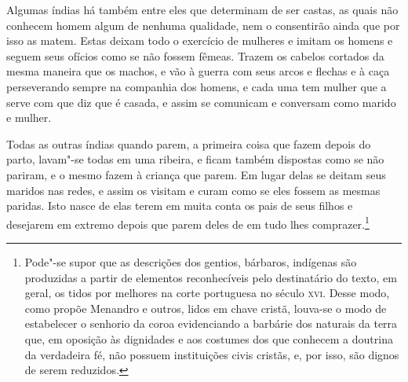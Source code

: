 Algumas índias há também entre eles que determinam de ser castas, as
quais não conhecem homem algum de nenhuma qualidade, nem o consentirão
ainda que por isso as matem. Estas deixam todo o exercício de mulheres
e imitam os homens e seguem seus ofícios como se não fossem fêmeas.
Trazem os cabelos cortados da mesma maneira que os machos, e vão à
guerra com seus arcos e flechas e à caça perseverando sempre na				%
companhia dos homens, e cada uma tem mulher que a serve com que diz que
é casada, e assim se comunicam e conversam como marido e mulher.

Todas as outras índias quando parem, a primeira coisa que fazem depois
do parto, lavam"-se todas em uma ribeira, e ficam também dispostas como		%
se não pariram, e o mesmo fazem à criança que parem. Em lugar delas se
deitam seus maridos nas redes, e assim os visitam e curam como se eles
fossem as mesmas paridas. Isto nasce de elas terem em muita conta os
pais de seus filhos e desejarem em extremo depois que parem deles de em
tudo lhes comprazer.\footnote{ Pode"-se supor que as descrições dos gentios,
bárbaros, indígenas são produzidas a partir de elementos reconhecíveis
pelo destinatário do texto, em geral, os tidos por melhores na corte portuguesa
no século \textsc{xvi}. Desse modo, como propõe Menandro e outros, lidos em chave
cristã, louva-se o modo de estabelecer o senhorio da coroa evidenciando a
barbárie dos naturais da terra que, em oposição às dignidades e aos costumes dos
que conhecem a doutrina da verdadeira fé, não possuem instituições civis
cristãs, e, por isso, são dignos de serem reduzidos.}

